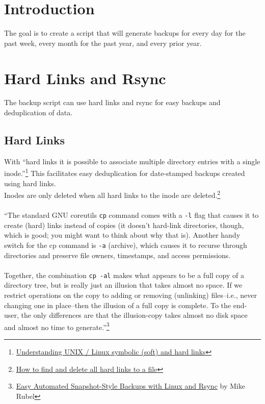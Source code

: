 \documentclass[12pt,letterpaper,dvips]{article}
\newcommand{\cmd}[1]{\texttt{#1}}
\begin{document}
\newpage
\section{Introduction}
The goal is to create a script that will generate backups for every day for the past
week, every month for the past year, and every prior year.


\newpage
\section{Hard Links and Rsync}
The backup script can use hard links and rsync for easy backups and deduplication of data.

\subsection{Hard Links}
With ``hard links it is possible to associate multiple directory entries with a single
inode.''\footnote{\href{http://www.cyberciti.biz/tips/understanding-unixlinux-symbolic-soft-and-hard-links.html}{Understanding UNIX / Linux symbolic (soft) and hard links}}
This facilitates easy deduplication for date-stamped backups created using hard links.\\
Inodes are only deleted when all hard links to the inode are deleted.\footnote{\href{http://linuxcommando.blogspot.com/2008/09/how-to-find-and-delete-all-hard-links.html}{How to find and delete all hard links to a file}} 
\\
\\
\noindent ``The standard GNU coreutils \cmd{cp} command comes with a \cmd{-l} flag that causes it to
create (hard) links instead of copies (it doesn't hard-link directories, though, which is good; you
might want to think about why that is).  Another handy switch for the cp command is \cmd{-a}
(archive), which causes it to recurse through directories and preserve file owners, timestamps, and
access permissions.\\
\\
\noindent Together, the combination \cmd{cp -al} makes what appears to be a full copy of a directory
tree, but is really just an illusion that takes almost no space.  If we restrict operations on the
copy to adding or removing (unlinking) files--i.e., never changing one in place--then the illusion of
a full copy is complete.  To the end-user, the only differences are that the illusion-copy takes
almost no disk space and almost no time to generate.''\footnote{\href{http://www.mikerubel.org/computers/rsync_snapshots/}{Easy Automated Snapshot-Style Backups with Linux and Rsync} by Mike Rubel}
\end{document}

